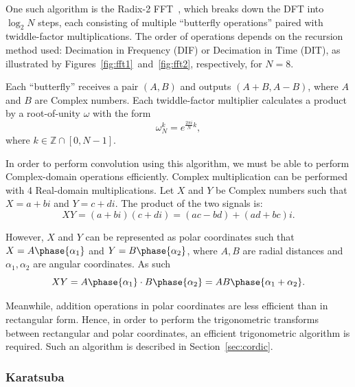 One such algorithm is the Radix-2 FFT~\cite{gauss1866nachlass,cooley1965algorithm}, which breaks down the DFT into $\log_2N$ steps, each consisting of multiple ``butterfly operations'' paired with twiddle-factor multiplications. The order of operations depends on the recursion method used: Decimation in Frequency (DIF) or Decimation in Time (DIT), as illustrated by Figures~\ref{fig:fft1}~and~\ref{fig:fft2}, respectively, for $N=8$.

Each ``butterfly'' receives a pair $(A,B)$ and outputs $(A+B,A-B)$, where $A$ and $B$ are Complex numbers. Each twiddle-factor multiplier calculates a product by a root-of-unity $\omega$ with the form
%
\begin{equation*}
  \omega_{N}^{k} = e^{\frac{2{\pi}i}{N}k},
\end{equation*}
%
where $k \in \mathbb{Z} \cap [0,N-1]$.

In order to perform convolution using this algorithm, we must be able to perform Complex-domain operations efficiently. Complex multiplication can be performed with 4 Real-domain multiplications. Let $X$ and $Y$ be Complex numbers such that $X=a+bi$ and $Y=c+di$. The product of the two signals is:
%
\begin{equation}\label{eq:cmul-rect}
  XY = (a+bi)(c+di) = (ac-bd) + (ad+bc)i.
\end{equation}


However, $X$ and $Y$ can be represented as polar coordinates such that $X=A\phase{\alpha_1}$ and $Y=B\phase{\alpha_2}$, where $A,B$ are radial distances and $\alpha_1,\alpha_2$ are angular coordinates. As such
%  
\begin{equation}\label{eq:cmul-pol}
  XY = A\phase{\alpha_1} \cdot B\phase{\alpha_2} = AB\phase{\alpha_1+\alpha_2}.
\end{equation}


Meanwhile, addition operations in polar coordinates are less efficient than in rectangular form. Hence, in order to perform the trigonometric transforms between rectangular and polar coordinates, an efficient trigonometric algorithm is required. Such an algorithm is described in Section~\ref{sec:cordic}.

\subsubsection{Karatsuba}

